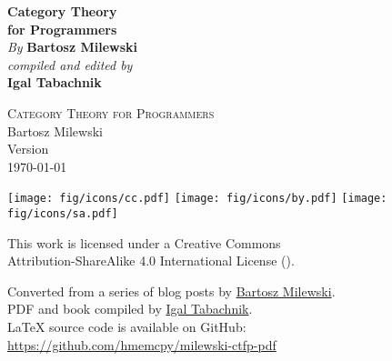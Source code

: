 

\thispagestyle{empty}

\vspace*{80pt}

\begin{raggedleft}
\fontsize{24pt}{24pt}\selectfont
\textbf{Category Theory \\ for Programmers}\\
\ifdefined{}
\fi
\vspace*{1cm}
\fontsize{16pt}{18pt}\selectfont \textit{By } \textbf{Bartosz Milewski}\\
\vspace{1cm}
\fontsize{12pt}{14pt}\selectfont \textit{compiled and edited by}\\ \textbf{Igal Tabachnik}\\

\end{raggedleft}


\newpage

\vspace*{0.3\textheight}
\thispagestyle{empty}

\begin{small}
\begin{center}

\textsc{Category Theory for Programmers}\\

\vspace{1.0em}
\noindent
Bartosz Milewski\\

\vspace{1.26em}
\noindent
Version \texttt{\OPTversion}\\\today


\vspace{1.6em}
\noindent
\texttt{[image: fig/icons/cc.pdf]}
\texttt{[image: fig/icons/by.pdf]}
\texttt{[image: fig/icons/sa.pdf]}

\vspace{0.4em}
\noindent
This work is licensed under a Creative Commons\\
Attribution-ShareAlike 4.0 International License
(\href{http://creativecommons.org/licenses/by-sa/4.0/}{}).

\vspace{1.26em}
\noindent
Converted from a series of blog posts by \href{https://bartoszmilewski.com/2014/10/28/category-theory-for-programmers-the-preface/}{Bartosz Milewski}.\\
PDF and book compiled by \href{https://hmemcpy.com}{Igal Tabachnik}.\\
\vspace{1.26em}
\noindent
\LaTeX{} source code is available on GitHub: \href{https://github.com/hmemcpy/milewski-ctfp-pdf}{https://github.com/hmemcpy/milewski-ctfp-pdf} 
\end{center}
\end{small}
